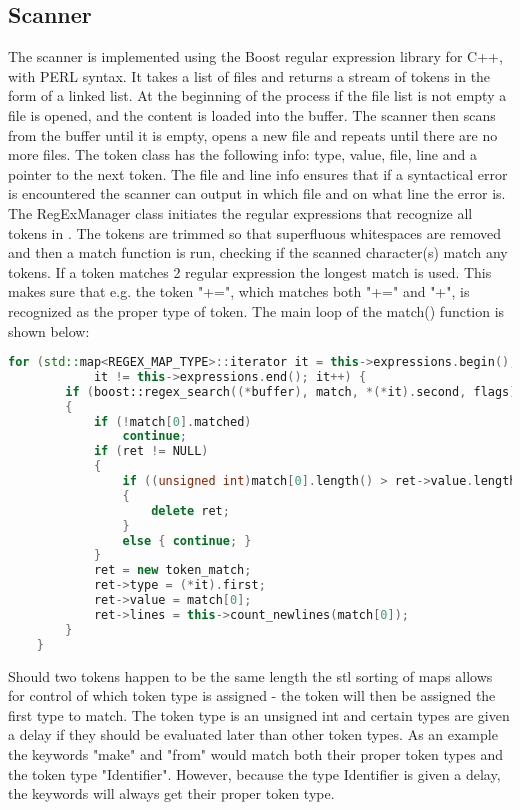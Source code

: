 \subsection{Scanner}
The scanner is implemented using the Boost regular expression library for C++, with PERL syntax. It takes a list of files and returns a stream of tokens in the form of a linked list. At the beginning of the process if the file list is not empty a file is opened, and the content is loaded into the buffer. The scanner then scans from the buffer until it is empty, opens a new file and repeats until there are no more files.
\vspace{10pt}
The token class has the following info: type, value, file, line and a pointer to the next token. The file and line info ensures that if a syntactical error is encountered the scanner can output in which file and on what line the error is. 
\vspace{10pt}
The RegExManager class initiates the regular expressions that recognize all tokens in \langname{}. The tokens are trimmed so that superfluous whitespaces are removed and then a match function is run, checking if the scanned character(s) match any tokens. If a token matches 2 regular expression the longest match is used. This makes sure that e.g. the token "+=", which matches both "+=" and "+", is recognized as the proper type of token. The main loop of the match() function is shown below:

\begin{lstlisting}[language = c++]
	for (std::map<REGEX_MAP_TYPE>::iterator it = this->expressions.begin();
			it != this->expressions.end(); it++) {
		if (boost::regex_search((*buffer), match, *(*it).second, flags))
		{
			if (!match[0].matched)
				continue;
			if (ret != NULL)
			{
				if ((unsigned int)match[0].length() > ret->value.length())
				{
					delete ret;
				}
				else { continue; }
			}
			ret = new token_match;
			ret->type = (*it).first;
			ret->value = match[0];
			ret->lines = this->count_newlines(match[0]);
		}
	}
\end{lstlisting}

Should two tokens happen to be the same length the \ac{stl} sorting of maps allows for control of which token type is assigned - the token will then be assigned the first type to match. The token type is an unsigned int and certain types are given a delay if they should be evaluated later than other token types. As an example the keywords "make" and "from" would match both their proper token types and the token type "Identifier". However, because the type Identifier is given a delay, the keywords will always get their proper token type.

